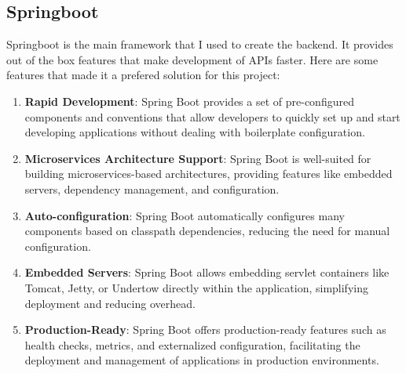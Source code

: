 \documentclass[a4paper, 12pt]{report}
\begin{document}
\subsection{Springboot}
\noindent Springboot is the main framework that I used to create the backend. It provides out of the box features that make development of APIs faster. Here are some features that made it a prefered solution for this project:
\begin{enumerate}
  \item \textbf{Rapid Development}: Spring Boot provides a set of pre-configured components and conventions that allow developers to quickly set up and start developing applications without dealing with boilerplate configuration.
  
  \item \textbf{Microservices Architecture Support}: Spring Boot is well-suited for building microservices-based architectures, providing features like embedded servers, dependency management, and configuration.
  
  \item \textbf{Auto-configuration}: Spring Boot automatically configures many components based on classpath dependencies, reducing the need for manual configuration.
  
  \item \textbf{Embedded Servers}: Spring Boot allows embedding servlet containers like Tomcat, Jetty, or Undertow directly within the application, simplifying deployment and reducing overhead.
  
  \item \textbf{Production-Ready}: Spring Boot offers production-ready features such as health checks, metrics, and externalized configuration, facilitating the deployment and management of applications in production environments.
\end{enumerate}
\end{document}
